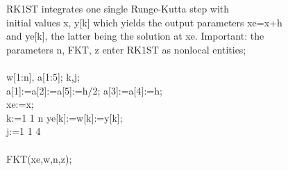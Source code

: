 \documentclass[a4paper,11pt]{article}
\begin{document}
\begin{flushleft}
{\hspace{1.0cm}\hspace{1.0cm} RK1ST integrates one single Runge-Kutta step with\\
\hspace{1.0cm}\hspace{1.0cm}initial values x, y[k] which yields the output parameters xe=x+h\\
\hspace{1.0cm}\hspace{1.0cm}and ye[k], the latter being the solution at xe.  Important: the\\
\hspace{1.0cm}\hspace{1.0cm}parameters n, FKT, z enter RK1ST as nonlocal entities;\\
\hspace{1.0cm}\hspace{1.0cm}\\
\hspace{1.0cm}\hspace{1.0cm}\hspace{1.0cm} w[1:n], a[1:5];  k,j;\\
\hspace{1.0cm}\hspace{1.0cm}\hspace{1.0cm}a[1]:=a[2]:=a[5]:=h/2; a[3]:=a[4]:=h;\\
\hspace{1.0cm}\hspace{1.0cm}\hspace{1.0cm}xe:=x;\\
\hspace{1.0cm}\hspace{1.0cm}\hspace{1.0cm} k:=1  1  n  ye[k]:=w[k]:=y[k];\\
\hspace{1.0cm}\hspace{1.0cm}\hspace{1.0cm} j:=1  1  4 \\
\hspace{1.0cm}\hspace{1.0cm}\hspace{1.0cm}\hspace{1.0cm}\\
\hspace{1.0cm}\hspace{1.0cm}\hspace{1.0cm}\hspace{1.0cm}\hspace{1.0cm}FKT(xe,w,n,z);\\
}
\end{flushleft}
\end{document}
